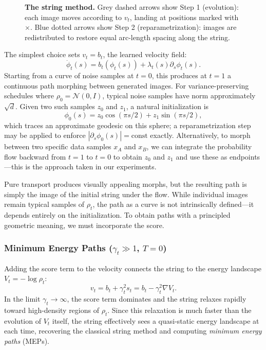 \documentclass{article}
\theoremstyle{plain}
\theoremstyle{definition}
\theoremstyle{remark}
\begin{document}
\begin{figure}
    \centering
    \resizebox{\linewidth}{!}{}
    \caption{\textbf{The string method.} Grey dashed arrows show Step 1 (evolution): each image moves according to $v_t$, landing at positions marked with $\times$. Blue dotted arrows show Step 2 (reparametrization): images are redistributed to restore equal arc-length spacing along the string.}
    \label{fig:string}
\end{figure}
The simplest choice sets $v_t = b_t$, the learned velocity field:
\begin{equation}
    \dot{\phi}_t(s) = b_t(\phi_t(s)) + \lambda_t(s) \partial_s \phi_t(s).
    \label{eq:pure_transport}
\end{equation}
Starting from a curve of noise samples at $t=0$, this produces at $t=1$ a continuous path morphing between generated images. For variance-preserving schedules where $\rho_0 = \mathcal{N}(0, I)$, typical noise samples have norm approximately $\sqrt{d}$. Given two such samples $z_0$ and $z_1$, a natural initialization is
\begin{equation}
    \phi_0(s) = z_0 \cos(\pi s/2) + z_1 \sin(\pi s/2),
    \label{eq:sphere_init}
\end{equation}
which traces an approximate geodesic on this sphere; a reparametrization step may be applied to enforce $|\partial_s \phi_0(s)| = \text{const}$ exactly. Alternatively, to morph between two specific data samples $x_A$ and $x_B$, we can integrate the probability flow backward from $t=1$ to $t=0$ to obtain $z_0$ and $z_1$ and use these as endpoints---this is the approach taken in our experiments.

Pure transport produces visually appealing morphs, but the resulting path is simply the image of the initial string under the flow. While individual images remain typical samples of $\rho_t$, the path as a curve is not intrinsically defined---it depends entirely on the initialization. To obtain paths with a principled geometric meaning, we must incorporate the score.

\subsubsection{Minimum Energy Paths ($\gamma_t \gg 1$, $T=0$)}

Adding the score term to the velocity connects the string to the energy landscape $V_t = -\log \rho_t$:
\begin{equation}
    v_t = b_t + \gamma_t^2 s_t = b_t - \gamma_t^2 \nabla V_t.
    \label{eq:mep_velocity}
\end{equation}
In the limit $\gamma_t \to \infty$, the score term dominates and the string relaxes rapidly toward high-density regions of $\rho_t$. Since this relaxation is much faster than the evolution of $V_t$ itself, the string effectively sees a quasi-static energy landscape at each time, recovering the classical string method and computing \emph{minimum energy paths} (MEPs).
\end{document}

